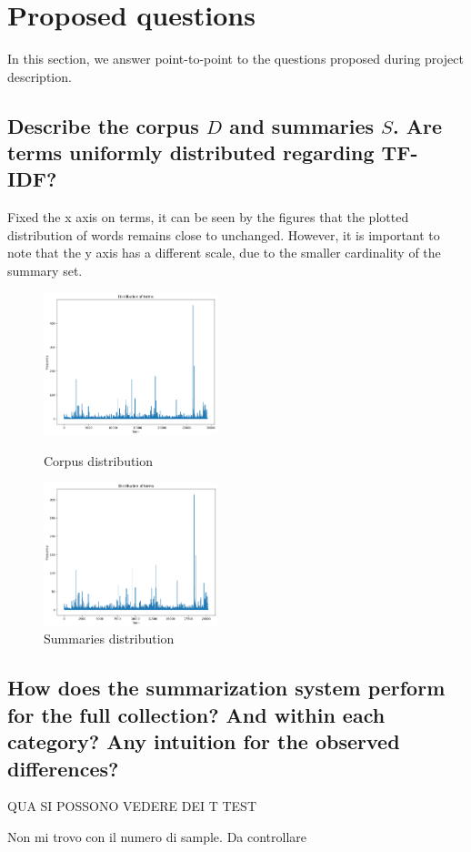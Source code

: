 \section{Proposed questions}
In this section, we answer point-to-point to the questions proposed during project description.

\subsection{Describe the corpus $D$ and summaries $S$. Are terms uniformly distributed regarding TF-IDF?}
Fixed the x axis on terms, it can be seen by the figures that the plotted distribution of words remains close to unchanged. However, it is important to note that the y axis has a different scale, due to the smaller cardinality of the summary set. 
\begin{figure}[h]
    \centering
    \includegraphics[width=0.45\textwidth]{images/dist_D.png}
    \caption{Corpus distribution}
    \label{fig:Corpus}
    \includegraphics*[width=0.45\textwidth]{images/dist_S.png}
    \caption{Summaries distribution}
    \label{fig:Summaries}
\end{figure}
\subsection{How does the summarization system perform for the full collection? And within each category? Any intuition for the observed differences?}
QUA SI POSSONO VEDERE DEI T TEST

Non mi trovo con il numero di sample. Da controllare

